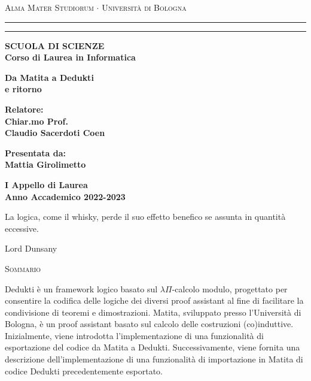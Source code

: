 \documentclass[12pt,a4paper]{mimosis}
\begin{document}
\begin{titlepage}
  \begin{center}
    {{
      \Large{\textsc{Alma Mater Studiorum $\cdot$ Universit\`a di Bologna}}
    }} \rule[0.1cm]{15.8cm}{0.1mm}
    \rule[0.5cm]{15.8cm}{0.6mm}
    {\small{\bf SCUOLA DI SCIENZE\\
    Corso di Laurea in Informatica}}
  \end{center}
  \vspace{15mm}
  \begin{center}
    {\LARGE{\bf Da Matita a Dedukti}}\\
    \vspace{3mm}
    {\LARGE{\bf e ritorno}}\\
  \end{center}
  \vspace{40mm}
  \par
  \noindent
  \begin{minipage}[t]{0.47\textwidth}
  {\large{\bf Relatore:\\
  Chiar.mo Prof.\\ %
  Claudio Sacerdoti Coen}}
  \end{minipage}
  \hfill
  \begin{minipage}[t]{0.47\textwidth}\raggedleft
  {\large{\bf Presentata da:\\
  Mattia Girolimetto}}
  \end{minipage}
  \vspace{20mm}
  \begin{center}
  {\large{\bf I Appello di Laurea\\%
  Anno Accademico 2022-2023}}%
  \end{center}
\end{titlepage}

\begin{titlepage}
	\thispagestyle{empty}
	\topmargin=6.5cm
	\raggedleft
	\large
	\em
  \epigraph{
    
La logica, come il whisky, perde il suo effetto benefico se assunta in quantità
  eccessive.
    }
  {Lord Dunsany}
	\clearpage{\pagestyle{empty}\cleardoublepage}
\end{titlepage}


\begin{center}
  \textsc{Sommario}
\end{center}
Dedukti è un framework logico basato sul $\lambda\Pi$-calcolo modulo, progettato
per consentire la codifica delle logiche dei diversi proof assistant al fine di
facilitare la condivisione di teoremi e dimostrazioni. Matita, sviluppato presso
l'Università di Bologna, è un proof assistant basato sul calcolo delle costruzioni
(co)induttive. Inizialmente, viene introdotta l'implementazione di una funzionalità
di esportazione del codice da Matita a Dedukti. Successivamente, viene fornita 
una descrizione dell'implementazione di una funzionalità di importazione in Matita
di codice Dedukti precedentemente esportato.
\end{document}
